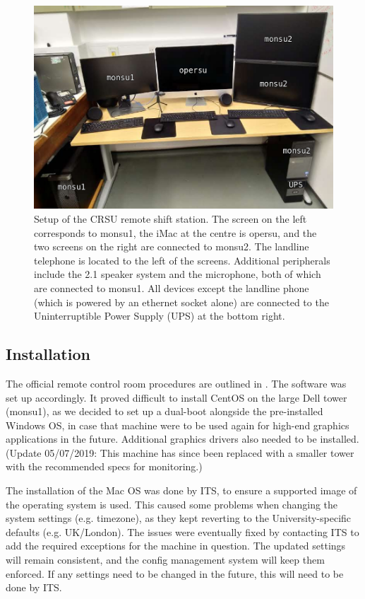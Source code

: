 \documentclass[a4paper,10pt]{article}
\begin{document}
\begin{figure}[htp]
	\includegraphics[width=\textwidth]{images/CRSU_final}
	\caption{Setup of the CRSU remote shift station. The screen on the left corresponds to monsu1, the iMac at the centre is opersu, and the two screens on the right are connected to monsu2. The landline telephone is located to the left of the screens. Additional peripherals include the 2.1 speaker system and the microphone, both of which are connected to monsu1. All devices except the landline phone (which is powered by an ethernet socket alone) are connected to the Uninterruptible Power Supply (UPS) at the bottom right.}
	\label{crsu_setup}
\end{figure}

\subsection{Installation}
The official remote control room procedures are outlined in \cite{doc4776}. The software was set up accordingly. It proved difficult to install CentOS on the large Dell tower (monsu1), as we decided to set up a dual-boot alongside the pre-installed Windows OS, in case that machine were to be used again for high-end graphics applications in the future. Additional graphics drivers also needed to be installed. (Update 05/07/2019: This machine has since been replaced with a smaller tower with the recommended specs for monitoring.)

The installation of the Mac OS was done by ITS, to ensure a supported image of the operating system is used. This caused some problems when changing the system settings (e.g. timezone), as they kept reverting to the University-specific defaults (e.g. UK/London). The issues were eventually fixed by contacting ITS to add the required exceptions for the machine in question. The updated settings will remain consistent, and the config management system will keep them enforced. If any settings need to be changed in the future, this will need to be done by ITS.
\end{document}
